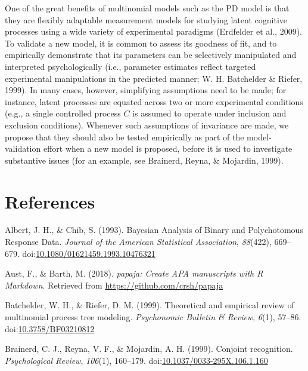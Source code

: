 \documentclass[man]{apa6}
\theoremstyle{definition}
\theoremstyle{definition}
\theoremstyle{definition}
\theoremstyle{remark}
\begin{document}
One of the great benefits of multinomial models such as the PD model is
that they are flexibly adaptable measurement models for studying latent
cognitive processes using a wide variety of experimental paradigms
(Erdfelder et al., 2009). To validate a new model, it is common to
assess its goodness of fit, and to empirically demonstrate that its
parameters can be selectively manipulated and interpreted
psychologically (i.e., parameter estimates reflect targeted experimental
manipulations in the predicted manner; W. H. Batchelder \& Riefer,
1999). In many cases, however, simplifying assumptions need to be made;
for instance, latent processes are equated across two or more
experimental conditions (e.g., a single controlled process \(C\) is
assumed to operate under inclusion and exclusion conditions). Whenever
such assumptions of invariance are made, we propose that they should
also be tested empirically as part of the model-validation effort when a
new model is proposed, before it is used to investigate substantive
issues (for an example, see Brainerd, Reyna, \& Mojardin, 1999).

\clearpage

\section{References}\label{references}

\setlength{\parindent}{-0.5in} \setlength{\leftskip}{0.5in}
\setlength{\parskip}{8pt}

\hypertarget{refs}{}
\hypertarget{ref-albert_bayesian_1993}{}
Albert, J. H., \& Chib, S. (1993). Bayesian Analysis of Binary and
Polychotomous Response Data. \emph{Journal of the American Statistical
Association}, \emph{88}(422), 669--679.
doi:\href{https://doi.org/10.1080/01621459.1993.10476321}{10.1080/01621459.1993.10476321}

\hypertarget{ref-R-papaja}{}
Aust, F., \& Barth, M. (2018). \emph{papaja: Create APA manuscripts with
R Markdown}. Retrieved from \url{https://github.com/crsh/papaja}

\hypertarget{ref-batchelder_theoretical_1999}{}
Batchelder, W. H., \& Riefer, D. M. (1999). Theoretical and empirical
review of multinomial process tree modeling. \emph{Psychonomic Bulletin
\& Review}, \emph{6}(1), 57--86.
doi:\href{https://doi.org/10.3758/BF03210812}{10.3758/BF03210812}

\hypertarget{ref-brainerd_conjoint_1999}{}
Brainerd, C. J., Reyna, V. F., \& Mojardin, A. H. (1999). Conjoint
recognition. \emph{Psychological Review}, \emph{106}(1), 160--179.
doi:\href{https://doi.org/10.1037/0033-295X.106.1.160}{10.1037/0033-295X.106.1.160}
\end{document}
